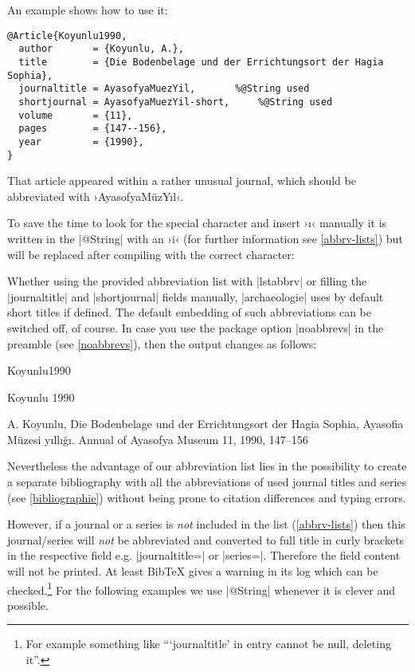 \documentclass[a4paper,
10pt,
greek,
french,
spanish,
italian,
ngerman,
english
]{ltxdoc}
\begin{document}
An example shows how to use it:
\begin{lstlisting}[style=bibentry,label=Koyunlu1990,caption={{@}Article\{Koyunlu1990,…\} }]
@Article{Koyunlu1990,
  author       = {Koyunlu, A.},
  title        = {Die Bodenbelage und der Errichtungsort der Hagia Sophia},
  journaltitle = AyasofyaMuezYil,		%@String used
  shortjournal = AyasofyaMuezYil-short,		%@String used
  volume       = {11},
  pages        = {147--156},
  year         = {1990},
}
\end{lstlisting}

That article appeared within a rather unusual journal, 
which should be abbreviated with ›AyasofyaMüzYıl‹.

To save the time to look for the special character and insert ›ı‹ manually 
it is written in the |@String| with an ›i‹ (for further information see \cref{abbrv-lists}) but will be replaced after compiling with the correct character:


Whether using the provided abbreviation list with |lstabbrv| or filling the |journaltitle| and |shortjournal| fields manually, |archaeologie| uses by default short titles if defined.
The default embedding of such abbreviations can be switched off, of course.
In case you use the package option |noabbrevs| in the preamble (see \cref{noabbrevs}), then the output changes as follows:
\begin{bibbsp}{Koyunlu1990}
\parbox[t]{2cm}{Koyunlu 1990} \parbox[t]{9cm}{A. Koyunlu, Die Bodenbelage und der Errichtungsort der Hagia Sophia, {\color{red}Ayasofia Müzesi yıllığı. Annual of Ayasofya Museum} 11, 1990, 147–156}
\end{bibbsp}
Nevertheless the advantage of our abbreviation list lies in the possibility to create a separate bibliography with all the abbreviations of used journal titles and series (see \cref{bibliographie}) without being prone to citation differences and typing errors.

However, if a journal or a series is \emph{not} included in the list (\cref{abbrv-lists}) 
then this journal/series will \emph{not} be abbreviated and converted to full title in curly brackets in the respective field e.g. |journaltitle=| or |series=|. Therefore the field content will not be printed. At least Bib\TeX{} gives a warning in its log which can be checked.\footnote{For example something like \enquote{\enquote{journaltitle} in entry  cannot be null, deleting it}.}
For the following examples we use |@String| whenever it is clever and possible.
\end{document}
